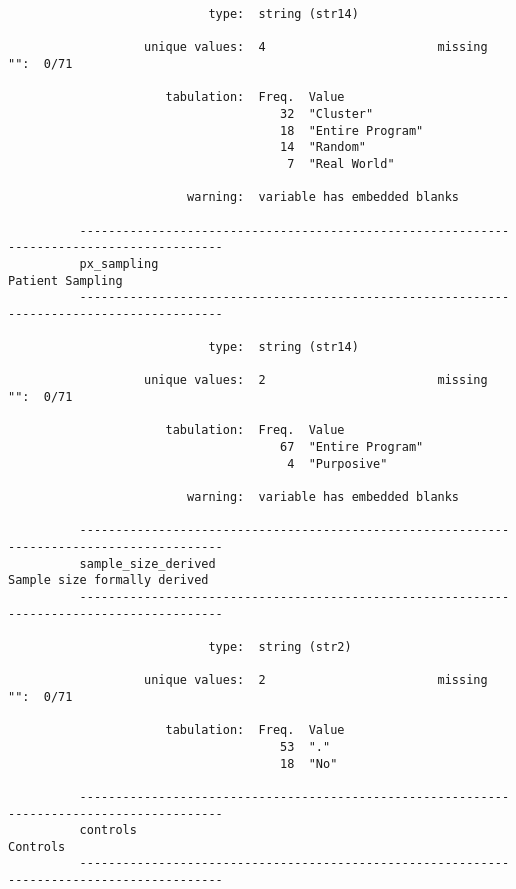 \documentclass{article}
\begin{document}
\begin{verbatim}
                            type:  string (str14)
          
                   unique values:  4                        missing "":  0/71
          
                      tabulation:  Freq.  Value
                                      32  "Cluster"
                                      18  "Entire Program"
                                      14  "Random"
                                       7  "Real World"
          
                         warning:  variable has embedded blanks
          
          ------------------------------------------------------------------------------------------
          px_sampling                                                               Patient Sampling
          ------------------------------------------------------------------------------------------
          
                            type:  string (str14)
          
                   unique values:  2                        missing "":  0/71
          
                      tabulation:  Freq.  Value
                                      67  "Entire Program"
                                       4  "Purposive"
          
                         warning:  variable has embedded blanks
          
          ------------------------------------------------------------------------------------------
          sample_size_derived                                           Sample size formally derived
          ------------------------------------------------------------------------------------------
          
                            type:  string (str2)
          
                   unique values:  2                        missing "":  0/71
          
                      tabulation:  Freq.  Value
                                      53  "."
                                      18  "No"
          
          ------------------------------------------------------------------------------------------
          controls                                                                          Controls
          ------------------------------------------------------------------------------------------
          

\end{verbatim}
\end{document}
